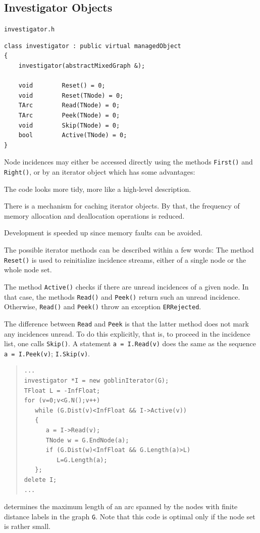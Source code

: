 \documentclass[a4paper,11pt,twoside]{book}
\begin{document}
\begin{multicols}{2}
\section{Investigator Objects}
\myinclude\verb/investigator.h/
\begin{mymethods}
\begin{verbatim}
class investigator : public virtual managedObject
{
    investigator(abstractMixedGraph &);

    void        Reset() = 0;
    void        Reset(TNode) = 0;
    TArc        Read(TNode) = 0;
    TArc        Peek(TNode) = 0;
    void        Skip(TNode) = 0;
    bool        Active(TNode) = 0;
}
\end{verbatim}
\end{mymethods}
Node incidences may either be accessed directly using the methods \verb/First()/
and \verb/Right()/, or by an iterator object which has some advantages:
\begin{myitemize}
\item The code looks more tidy, more like a high-level description.
\item There is a mechanism for caching iterator objects. By that, the frequency
    of memory allocation and deallocation operations is reduced.
\item Development is speeded up since memory faults can be avoided.
\end{myitemize}
The possible iterator methods can be described within a few words: 
The method \verb/Reset()/ is used to reinitialize incidence streams,
either of a single node or the whole node set.

The method \verb/Active()/ checks if there are unread incidences of a given
node. In that case, the methods \verb/Read()/ and \verb/Peek()/ return such an
unread incidence. Otherwise, \verb/Read()/ and \verb/Peek()/ throw an exception
\verb/ERRejected/.

The difference between \verb/Read/ and \verb/Peek/ is that the latter method
does not mark any incidences unread. To do this explicitly, that is, to proceed
in the incidence list, one calls \verb/Skip()/. A statement
\verb/a = I.Read(v)/ does the same as the sequence \verb/a = I.Peek(v)/;
\verb/I.Skip(v)/.
\sample
\begin{quote}
\begin{verbatim}
...
investigator *I = new goblinIterator(G);
TFloat L = -InfFloat;
for (v=0;v<G.N();v++)
   while (G.Dist(v)<InfFloat && I->Active(v))
   {
      a = I->Read(v);
      TNode w = G.EndNode(a);
      if (G.Dist(w)<InfFloat && G.Length(a)>L)
         L=G.Length(a);
   };
delete I;
...
\end{verbatim}
\end{quote}
determines the maximum length of an arc spanned by the nodes with
finite distance labels in the graph \verb/G/. Note that this code is
optimal only if the node set is rather small.



\end{multicols}
\end{document}
